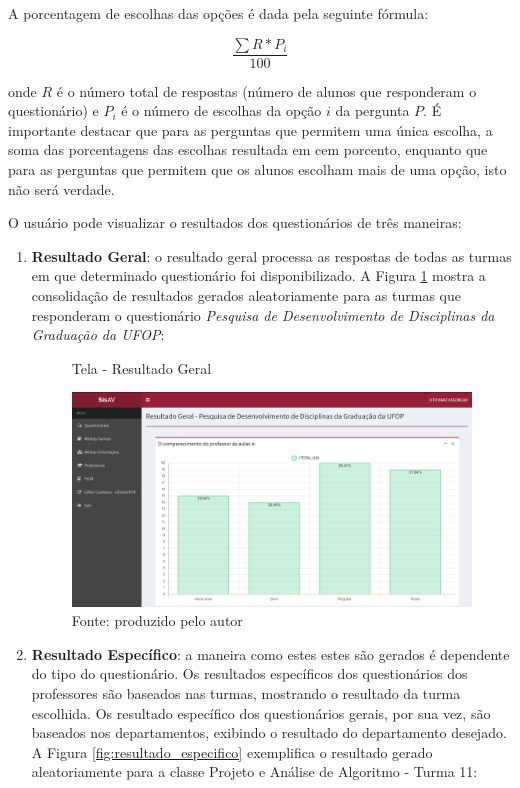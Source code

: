\documentclass[
  12pt,       %
  openright,      %
  oneside,      %
  a4paper,      %
  english,      %
  french,        %
  spanish,     %
  brazil        %
  ]{abntex2-decsi}
\begin{document}
			A porcentagem de escolhas das opções é dada pela seguinte fórmula: 
            
            $$\frac{\sum R * P_{i}}{100}$$
            
            onde $R$ é o número total de respostas (número de alunos que responderam o questionário) e $P_{i}$ é o número de escolhas da opção $i$ da pergunta $P$. É importante destacar que para as perguntas que permitem uma única escolha, a soma das porcentagens das escolhas resultada em cem porcento, enquanto que para as perguntas que permitem que os alunos escolham mais de uma opção, isto não será verdade.
            
            O usuário pode visualizar o resultados dos questionários de três maneiras:

            \begin{enumerate}

            \item \textbf{Resultado Geral}: o resultado geral processa as respostas de todas as turmas em que determinado questionário foi disponibilizado. A Figura \ref{fig:resultado_geral} mostra a consolidação de resultados gerados aleatoriamente para as turmas que responderam o questionário \textit{Pesquisa de Desenvolvimento de Disciplinas da Graduação da UFOP}:
            
            \begin{figure}[h]
                \centering
                \caption{Tela - Resultado Geral}
                \includegraphics[width=1\textwidth]{img/resultado_geral}
                \caption*{Fonte: produzido pelo autor}
                \label{fig:resultado_geral}
   		 	\end{figure}

            \item \textbf{Resultado Específico}: a maneira como estes estes são gerados é dependente do tipo do questionário. Os resultados específicos dos questionários dos professores são baseados nas turmas, mostrando o resultado da turma escolhida. Os resultado específico dos questionários gerais, por sua vez, são baseados nos departamentos, exibindo o resultado do departamento desejado. A Figura \ref{fig:resultado_especifico} exemplifica o resultado gerado aleatoriamente para a classe Projeto e Análise de Algoritmo - Turma 11:
            

\end{enumerate}
\end{document}
